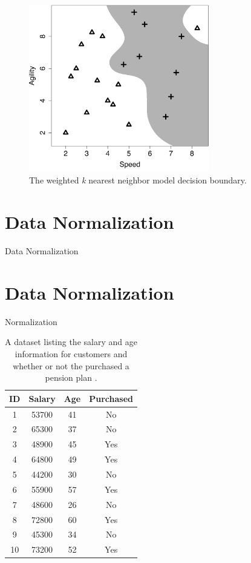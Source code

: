 \documentclass[xcolor={table}]{beamer}
\newcommand{\SectionSlideShortHeader}[3][]{
	\ifthenelse{\isempty{#1}}
		{\section[#3]{#2}\begin{frame} \begin{center}\begin{huge}#2\end{huge}\end{center}\end{frame}}
		{\section[#1]{#2}\begin{frame} \begin{center}\begin{huge}#3\end{huge}\end{center}\end{frame}}
}
\begin{document}
 \begin{frame} 
\begin{figure}[htb]
       \begin{centering}
       \includegraphics[width=0.7\textwidth]{images/knn_fs_10_small.pdf}
       \caption{The weighted \textit{k} nearest neighbor model decision boundary.}
       \label{fig:weightedk}
       \end{centering}
\end{figure}
\end{frame} 

\SectionSlideShortHeader{Data Normalization}{Normalization}

 \begin{frame} 
\begin{table}[!tb]
\caption{A dataset listing the salary and age information for customers and whether or not the purchased a pension plan .}
\label{table:salaryAgeDataset}
\centering
\begin{footnotesize}
\begin{tabular}{ c  c  c  c }
\hline
\textbf{ID} & \textbf{Salary} & \textbf{Age} & \textbf{Purchased}\\
\hline
1 & 53700	& 41	& No \\
2 & 65300	& 37	& No \\
3 & 48900	& 45	& Yes \\
4 & 64800	& 49	& Yes \\
5 & 44200	& 30	& No \\
6 & 55900	& 57	& Yes \\
7 & 48600	& 26	& No \\
8 & 72800	& 60	& Yes \\
9 & 45300	& 34	& No \\
10 & 73200	& 52	& Yes \\
\hline
\end{tabular}
\end{footnotesize}
\end{table}
\end{frame} 
\end{document}
